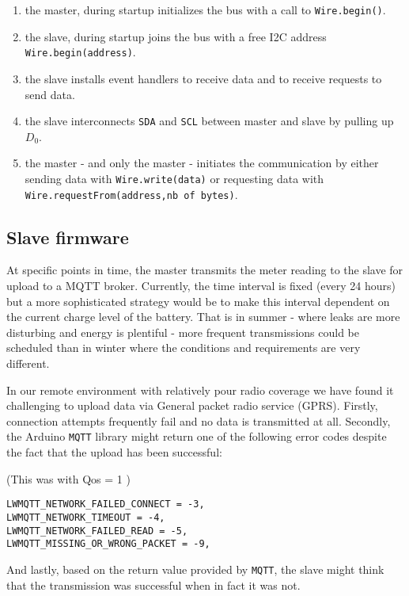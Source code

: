 \begin{enumerate}
    \item the master, during startup initializes the bus with a call to \texttt{Wire.begin()}.
    \item the slave, during startup joins the bus with a free I2C address \texttt{Wire.begin(address)}.
    \item the slave installs event handlers to receive data and to receive requests to send data.
    \item the slave interconnects \texttt{SDA} and \texttt{SCL} between master and slave by pulling up $D_0$.
    \item the master - and only the master - initiates the communication by either sending data with \texttt{Wire.write(data)}
          or requesting data with \texttt{Wire.requestFrom(address,nb of bytes)}.
\end{enumerate}



\subsection{Slave firmware}

At specific points in time, the master transmits the meter reading to the slave for upload to a MQTT broker.
Currently, the time interval is fixed (every 24 hours) but a more sophisticated strategy would be to make
this interval dependent on the current charge level of the battery. That is in summer - where leaks are more disturbing and
energy is plentiful - more frequent transmissions could be scheduled than in winter where the conditions and
requirements are
very different.

In our remote environment with relatively pour radio coverage we have found it challenging to upload data via
General packet radio service (GPRS).
Firstly, connection attempts frequently fail and no data is transmitted at all.
Secondly, the Arduino \texttt{MQTT} library might return one of the following error codes despite the fact
that the upload has been successful:

(This was with Qos = 1 )

\begin{verbatim}
LWMQTT_NETWORK_FAILED_CONNECT = -3,
LWMQTT_NETWORK_TIMEOUT = -4,
LWMQTT_NETWORK_FAILED_READ = -5,
LWMQTT_MISSING_OR_WRONG_PACKET = -9,
\end{verbatim}


And lastly, based on the return value provided by \texttt{MQTT},
the slave might think that the transmission was successful when in fact it was not.


